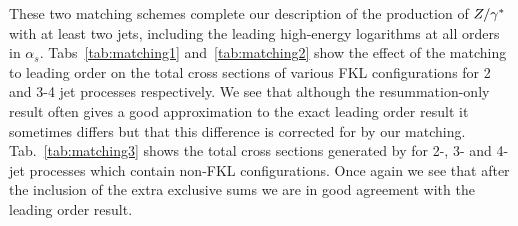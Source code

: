 	These two matching schemes complete our description of the production of $Z/\gamma^*$
	with at least two jets, including the leading high-energy logarithms at all
	orders in $\alpha_s$.  Tabs~\eqref{tab:matching1} and~\eqref{tab:matching2} show
	the effect of the matching to leading order on the total cross sections of various FKL
	configurations for 2 and 3-4 jet processes respectively.  We see that although the
	resummation-only result often gives a good approximation to the exact leading order result
	it sometimes differs but that this difference is corrected for by our matching.  Tab.~\eqref{tab:matching3}
	shows the total cross sections generated by \HEJ for 2-, 3- and 4-jet processes which contain non-FKL
	configurations.  Once again we see that after the inclusion of the extra exclusive sums we are in good
	agreement with the leading order result.

